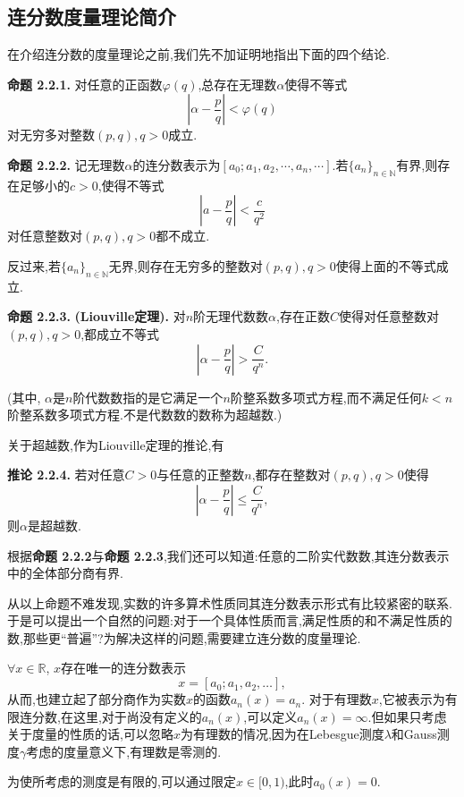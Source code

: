 \subsection{连分数度量理论简介}
在介绍连分数的度量理论之前,我们先不加证明地指出下面的四个结论.\par
\textbf{命题 2.2.1.  }\textsuperscript{\cite{Khinchin}}
对任意的正函数$\varphi(q)$,总存在无理数$\alpha$使得不等式
$$\left|\alpha-\frac{p}{q}\right|<\varphi\left(q\right)$$
对无穷多对整数$(p,q),q>0$成立.
\par
\textbf{命题 2.2.2.  }\textsuperscript{\cite{Khinchin}}
记无理数$\alpha$的连分数表示为$[a_0;a_1,a_2,\cdots,a_n,\cdots]$.若$\{a_n\}_{n\in \mathbb{N}}$有界,则存在足够小的$c>0$,使得不等式
$$\left|a-\frac{p}{q}\right|<\frac{c}{q^2}$$
对任意整数对$(p,q),q>0$都不成立.\par
反过来,若$\{a_n\}_{n\in \mathbb{N}}$无界,则存在无穷多的整数对$(p,q),q>0$使得上面的不等式成立.
\par
\textbf{命题 2.2.3.  }\textsuperscript{\cite{Khinchin}}\textbf{(Liouville定理).   }
对$n$阶无理代数数$\alpha$,存在正数$C$使得对任意整数对$(p,q),q>0$,都成立不等式
$$\left|\alpha-\frac{p}{q}\right|>\frac{C}{q^n}.$$
\par
(其中, $\alpha$是$n$阶代数数指的是它满足一个$n$阶整系数多项式方程,而不满足任何$k<n$阶整系数多项式方程.不是代数数的数称为超越数.)\par
关于超越数,作为Liouville定理的推论,有\par
\textbf{推论 2.2.4.  }\textsuperscript{\cite{Khinchin}}
若对任意$C>0$与任意的正整数$n$,都存在整数对$(p,q),q>0$使得
$$\left|\alpha-\frac pq\right|\leqslant\frac C{q^n},$$
则$\alpha$是超越数.
\par
根据\textbf{命题 2.2.2}与\textbf{命题 2.2.3},我们还可以知道:任意的二阶实代数数,其连分数表示中的全体部分商有界.\par
从以上命题不难发现,实数的许多算术性质同其连分数表示形式有比较紧密的联系.于是可以提出一个自然的问题:对于一个具体性质而言,满足性质的和不满足性质的数,那些更“普遍”?为解决这样的问题,需要建立连分数的度量理论.\par
$\forall x \in\mathbb{R}$, $x$存在唯一的连分数表示
$$x=[a_0;a_1,a_2,\dots],$$
从而,也建立起了部分商作为实数$x$的函数$a_n(x)=a_n$.
对于有理数$x$,它被表示为有限连分数,在这里,对于尚没有定义的$a_n(x)$,可以定义$a_n(x)=\infty$.但如果只考虑关于度量的性质的话,可以忽略$x$为有理数的情况,因为在Lebesgue测度$\lambda$和Gauss测度$\gamma$考虑的度量意义下,有理数是零测的.\par
为使所考虑的测度是有限的,可以通过限定$x\in[0,1)$,此时$a_0(x)=0.$\par
